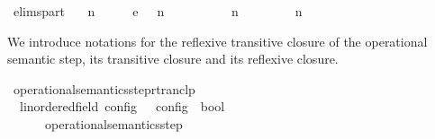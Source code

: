 \begin{isabellebody}
{\isacharbar}\ elims{\isacharunderscore}part{\isacharcolon}\isanewline
\ \ {\isacartoucheopen}{\isacharparenleft}{\isasymGamma}\ n\ {\isasymturnstile}\ {\isasymPsi}\ {\isasymtriangleright}\ {\isasymPhi}\ \ {\isasymhookrightarrow}\isactrlsub e\ \ {\isacharparenleft}{\isasymGamma}\ n\ {\isasymturnstile}\ {\isasymPsi}\ {\isasymtriangleright}\ {\isasymPhi}\isanewline
\ \ \ \ {\isasymLongrightarrow}\ {\isacharparenleft}{\isasymGamma}\ n\ {\isasymturnstile}\ {\isasymPsi}\ {\isasymtriangleright}\ {\isasymPhi}\ \ {\isasymhookrightarrow}\ \ {\isacharparenleft}{\isasymGamma}\ n\ {\isasymturnstile}\ {\isasymPsi}\ {\isasymtriangleright}\ {\isasymPhi}%
\begin{isamarkuptext}%
We introduce notations for the reflexive transitive closure of the operational 
  semantic step, its transitive closure and its reflexive closure.%
\end{isamarkuptext}\isamarkuptrue%
\isamarkupfalse%
\ operational{\isacharunderscore}semantics{\isacharunderscore}step{\isacharunderscore}rtranclp\isanewline
\ \ {\isacharcolon}{\isacharcolon}{\isacartoucheopen}{\isacharparenleft}{\isacharprime}{\isasymtau}{\isacharcolon}{\isacharcolon}linordered{\isacharunderscore}field{\isacharparenright}\ config\ {\isasymRightarrow}\ {\isacharprime}{\isasymtau}\ config\ {\isasymRightarrow}\ bool{\isacartoucheclose}\ \ \ \ \ \ \ \ \ \ \ \ \ \ {\isacharparenleft}{\isacartoucheopen}{\isacharunderscore}\ {\isasymhookrightarrow}\isactrlsup {\isacharasterisk}\isactrlsup {\isacharasterisk}\ {\isacharunderscore}{\isacartoucheclose}\ {}{}{\isacharparenright}\isanewline
{}\isanewline
\ \ {\isacartoucheopen}{\isasymC}\ {\isasymhookrightarrow}\isactrlsup {\isacharasterisk}\isactrlsup {\isacharasterisk}\ {\isasymC}\ {\isasymequiv}\ operational{\isacharunderscore}semantics{\isacharunderscore}step\isactrlsup {\isacharasterisk}\isactrlsup {\isacharasterisk}\ {\isasymC}\ {\isasymC}\isanewline

\end{isabellebody}
